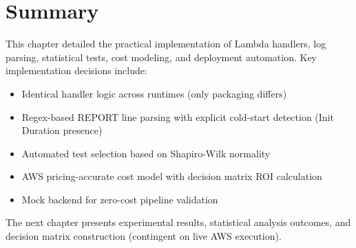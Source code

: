 \section{Summary}

This chapter detailed the practical implementation of Lambda handlers, log parsing, statistical tests, cost modeling, and deployment automation. Key implementation decisions include:

\begin{itemize}
    \item Identical handler logic across runtimes (only packaging differs)
    \item Regex-based REPORT line parsing with explicit cold-start detection (Init Duration presence)
    \item Automated test selection based on Shapiro-Wilk normality
    \item AWS pricing-accurate cost model with decision matrix ROI calculation
    \item Mock backend for zero-cost pipeline validation
\end{itemize}

The next chapter presents experimental results, statistical analysis outcomes, and decision matrix construction (contingent on live AWS execution).
